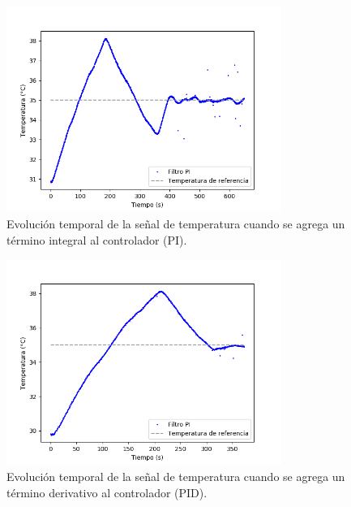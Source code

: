 \documentclass[a4paper,11pt]{article}
\begin{document}
\begin{figure}[!h]
\centering
\includegraphics[width=0.8\textwidth]{figs/PI_temp}
\caption{Evolución temporal de la señal de temperatura cuando se agrega
un término integral al controlador (PI).}
\label{fig:PI_temp}
\end{figure}

\begin{figure}[!h]
\centering
\includegraphics[width=0.8\textwidth]{figs/PID_temp}
\caption{Evolución temporal de la señal de temperatura cuando se agrega
un término derivativo al controlador (PID).}
\label{fig:PID_temp}
\end{figure}
\end{document}
